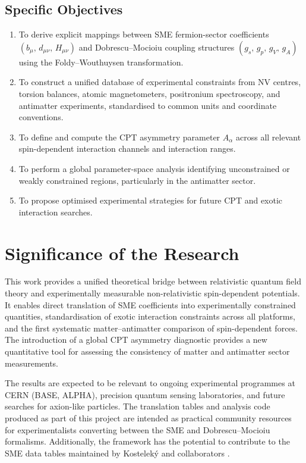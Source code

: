 \documentclass[12pt,a4paper]{report}
\begin{document}
\subsection*{Specific Objectives}

\begin{enumerate}
  \item To derive explicit mappings between SME fermion-sector coefficients
    $(b_{\mu},\, d_{\mu\nu},\, H_{\mu\nu})$ and Dobrescu--Mocioiu coupling
    structures $(g_{s},\, g_{p},\, g_{V},\, g_{A})$ using the
    Foldy--Wouthuysen transformation.
  \item To construct a unified database of experimental constraints from NV
    centres, torsion balances, atomic magnetometers, positronium spectroscopy,
    and antimatter experiments, standardised to common units and coordinate
    conventions.
  \item To define and compute the CPT asymmetry parameter $A_{\alpha}$ across
    all relevant spin-dependent interaction channels and interaction ranges.
  \item To perform a global parameter-space analysis identifying unconstrained
    or weakly constrained regions, particularly in the antimatter sector.
  \item To propose optimised experimental strategies for future CPT and exotic
    interaction searches.
\end{enumerate}

\section{Significance of the Research}

This work provides a unified theoretical bridge between relativistic quantum
field theory and experimentally measurable non-relativistic spin-dependent
potentials. It enables direct translation of SME coefficients into
experimentally constrained quantities, standardisation of exotic interaction
constraints across all platforms, and the first systematic matter--antimatter
comparison of spin-dependent forces. The introduction of a global CPT asymmetry
diagnostic provides a new quantitative tool for assessing the consistency of
matter and antimatter sector measurements.

The results are expected to be relevant to ongoing experimental programmes at
CERN (BASE, ALPHA), precision quantum sensing laboratories, and future searches
for axion-like particles. The translation tables and analysis code produced as
part of this project are intended as practical community resources for
experimentalists converting between the SME and Dobrescu--Mocioiu formalisms.
Additionally, the framework has the potential to contribute to the SME data
tables maintained by Kostelek\'{y} and collaborators \cite{Kostelecky2011}.
\end{document}
